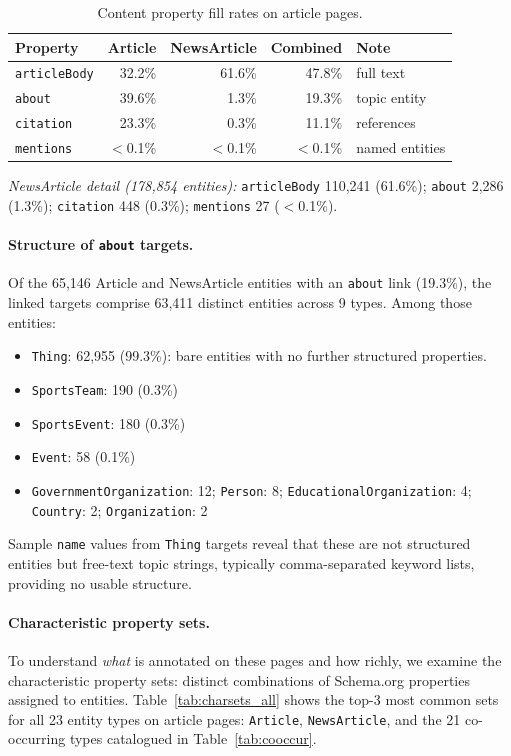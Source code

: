 \documentclass[11pt,a4paper]{article}
\begin{document}
\begin{table}[H]
\centering
\caption{Content property fill rates on article pages.}
\label{tab:article_props}
\begin{tabular}{lrrrl}
\toprule
\textbf{Property} & \textbf{Article} & \textbf{NewsArticle} & \textbf{Combined} & \textbf{Note} \\
\midrule
\texttt{articleBody} & 32.2\%  & 61.6\% & 47.8\% & full text \\
\texttt{about}       & 39.6\%  &  1.3\% & 19.3\% & topic entity \\
\texttt{citation}    & 23.3\%  &  0.3\% & 11.1\% & references \\
\texttt{mentions}    & $<$0.1\% & $<$0.1\% & $<$0.1\% & named entities \\
\bottomrule
\end{tabular}
\end{table}

\noindent\textit{NewsArticle detail (178{,}854 entities):}
\texttt{articleBody} 110{,}241 (61.6\%);
\texttt{about} 2{,}286 (1.3\%);
\texttt{citation} 448 (0.3\%);
\texttt{mentions} 27 ($<$0.1\%).

\paragraph{Structure of \texttt{about} targets.}
Of the 65{,}146 Article and NewsArticle entities with an \texttt{about} link
(19.3\%), the linked targets comprise 63{,}411 distinct entities across 9 types.
Among those entities:
\begin{itemize}[leftmargin=1.5em]
  \item \texttt{Thing}: 62{,}955 (99.3\%): bare entities with no further
        structured properties.
  \item \texttt{SportsTeam}: 190 (0.3\%)
  \item \texttt{SportsEvent}: 180 (0.3\%)
  \item \texttt{Event}: 58 (0.1\%)
  \item \texttt{GovernmentOrganization}: 12; \texttt{Person}: 8;
        \texttt{EducationalOrganization}: 4; \texttt{Country}: 2;
        \texttt{Organization}: 2
\end{itemize}
Sample \texttt{name} values from \texttt{Thing} targets reveal that these are
not structured entities but free-text topic strings, typically comma-separated
keyword lists, providing
no usable structure.


\paragraph{Characteristic property sets.}
To understand \emph{what} is annotated on these pages and how richly, we
examine the characteristic property sets: distinct combinations of Schema.org
properties assigned to entities.
Table~\ref{tab:charsets_all} shows the top-3 most common sets for all 23
entity types on article pages: \texttt{Article}, \texttt{NewsArticle},
and the 21 co-occurring types catalogued in Table~\ref{tab:cooccur}.
\end{document}
